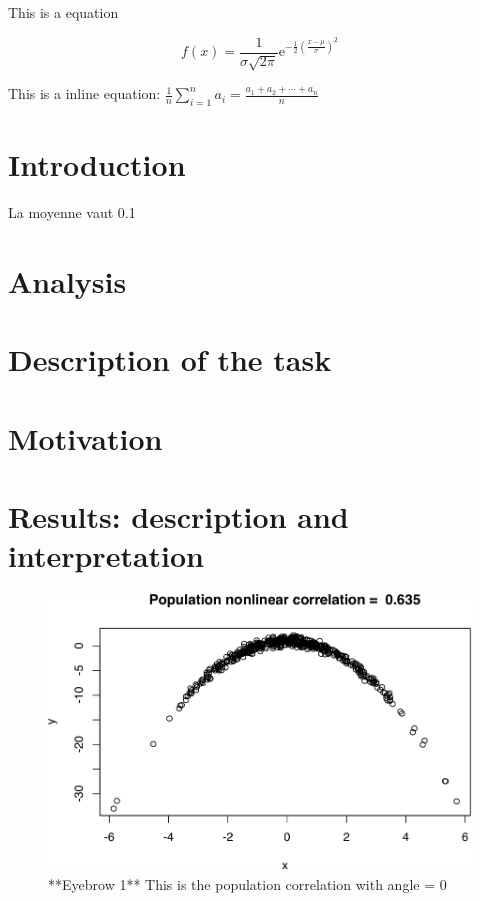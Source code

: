\documentclass[11pt,]{article}
\begin{document}
This is a  equation

\[
f(x)=\frac{1}{\sigma \sqrt{2 \pi}} \mathrm{e}^{-\frac{1}{2}\left(\frac{x-\mu}{\sigma}\right)^{2}}
\]

This is a inline  equation:
\(\frac{1}{n} \sum_{i=1}^{n} a_{i}=\frac{a_{1}+a_{2}+\cdots+a_{n}}{n}\)

\hypertarget{introduction}{%
\section{Introduction}\label{introduction}}

La moyenne vaut 0.1

\hypertarget{analysis}{%
\section{Analysis}\label{analysis}}

\hypertarget{description-of-the-task}{%
\section{Description of the task}\label{description-of-the-task}}

\hypertarget{motivation}{%
\section{Motivation}\label{motivation}}

\hypertarget{results-description-and-interpretation}{%
\section{Results: description and
interpretation}\label{results-description-and-interpretation}}

\begin{figure}

{\centering \includegraphics{RapportSTAT_files/figure-latex/nonlinear_q1-1} 

}

\caption{**Eyebrow 1** This is the population correlation with angle = 0}\label{fig:nonlinear_q1}
\end{figure}
\end{document}
